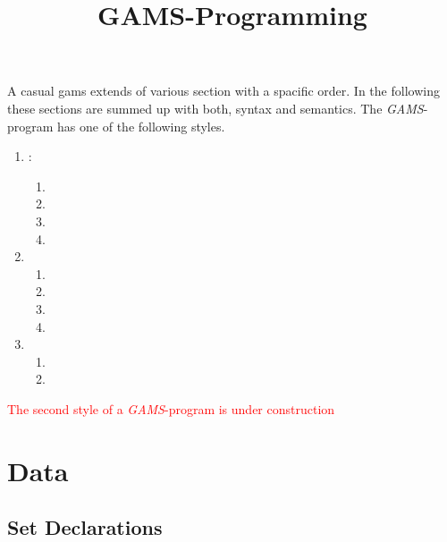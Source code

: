 \documentclass[10pt]{article}
\title{GAMS-Programming}
\begin{document}
\maketitle


  A casual gams extends of various section with a spacific order. In the
  following these sections are summed up with both, syntax and semantics.
  The \emph{GAMS}-program has one of the following styles.

  \begin{enumerate}
    \item {}:
    \begin{enumerate}
      \item {}
      \item {}
      \item {}
      \item {}
    \end{enumerate}
    \item {}
    \begin{enumerate}
      \item {}
      \item {}
      \item {}
      \item {}
    \end{enumerate}
    \item {}
    \begin{enumerate}
      \item {}
      \item {}
    \end{enumerate}
  \end{enumerate}
  


    \textcolor{red}{The second style of a \emph{GAMS}-program is under
    construction}



  \section{Data}
  \label{data}
    \subsection{Set Declarations}
    \label{data:declarations}
\end{document}
